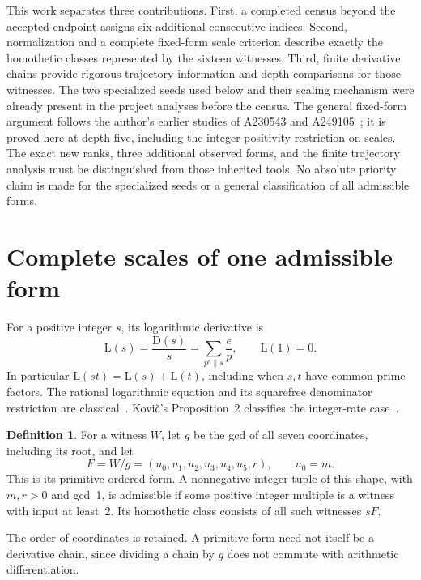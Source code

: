 \documentclass[11pt,a4paper]{article}
\newcommand{\D}{\mathrm{D}}
\newcommand{\Lrate}{\mathrm{L}}
\theoremstyle{definition}
\newtheorem{definition}[theorem]{Definition}
\theoremstyle{remark}
\begin{document}
This work separates three contributions. First, a completed census beyond
the accepted endpoint assigns six additional consecutive indices. Second,
normalization and a complete fixed-form scale criterion describe exactly
the homothetic classes represented by the sixteen witnesses. Third, finite
derivative chains provide rigorous trajectory information and depth
comparisons for those witnesses. The two specialized seeds used below and
their scaling mechanism were already present in the project analyses before
the census. The general fixed-form argument follows the author's earlier
studies of A230543 and A249105~\cite{corti230543,corti249105}; it is proved here
at depth five, including the integer-positivity restriction on scales.
The exact new ranks, three additional observed forms, and the finite
trajectory analysis must be distinguished from those inherited tools.
No absolute priority claim is made for the specialized seeds or a general
classification of all admissible forms.

\section{Complete scales of one admissible form}\label{sec:scales}

For a positive integer $s$, its logarithmic derivative is
\begin{equation}\label{eq:L}
 \Lrate(s)=\frac{\D(s)}{s}=\sum_{p^e\parallel s}\frac{e}{p},
 \qquad \Lrate(1)=0.
\end{equation}
In particular $\Lrate(st)=\Lrate(s)+\Lrate(t)$, including when $s,t$ have
common prime factors. The rational logarithmic equation and its squarefree
denominator restriction are classical~\cite[Section 8]{ufnarovski}.
Kovi\v{c}'s Proposition~2 classifies the integer-rate case~\cite{kovic}.

\begin{definition}\label{def:form}
For a witness $W$, let $g$ be the gcd of all seven coordinates, including
its root, and let
\[
 F=W/g=(u_0,u_1,u_2,u_3,u_4,u_5,r),\qquad u_0=m.
\]
This is its primitive ordered form. A nonnegative integer tuple of this
shape, with $m,r>0$ and gcd~1, is admissible if some positive integer
multiple is a witness with input at least~2. Its homothetic class consists
of all such witnesses $sF$.
\end{definition}

The order of coordinates is retained. A primitive form need not itself
be a derivative chain, since dividing a chain by $g$ does not commute
with arithmetic differentiation.
\end{document}
